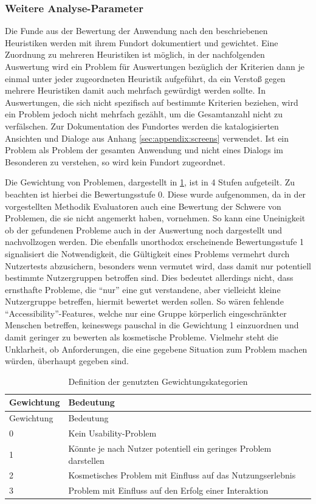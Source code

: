 \documentclass[
  12pt,
  ngerman,
  a4paper,
]{article}
\begin{document}
\hypertarget{weitere-analyse-parameter}{%
\subsubsection{Weitere
Analyse-Parameter}\label{weitere-analyse-parameter}}

Die Funde aus der Bewertung der Anwendung nach den beschriebenen
Heuristiken werden mit ihrem Fundort dokumentiert und gewichtet. Eine
Zuordnung zu mehreren Heuristiken ist möglich, in der nachfolgenden
Auswertung wird ein Problem für Auswertungen bezüglich der Kriterien
dann je einmal unter jeder zugeordneten Heuristik aufgeführt, da ein
Verstoß gegen mehrere Heuristiken damit auch mehrfach gewürdigt werden
sollte. In Auswertungen, die sich nicht spezifisch auf bestimmte
Kriterien beziehen, wird ein Problem jedoch nicht mehrfach gezählt, um
die Gesamtanzahl nicht zu verfälschen. Zur Dokumentation des Fundortes
werden die katalogisierten Ansichten und Dialoge aus Anhang
\ref{sec:appendix:screens} verwendet. Ist ein Problem als Problem der
gesamten Anwendung und nicht eines Dialogs im Besonderen zu verstehen,
so wird kein Fundort zugeordnet.

Die Gewichtung von Problemen, dargestellt in
\cref{tbl:weighting-definition}, ist in 4 Stufen aufgeteilt. Zu beachten
ist hierbei die Bewertungsstufe 0. Diese wurde aufgenommen, da in der
vorgestellten Methodik Evaluatoren auch eine Bewertung der Schwere von
Problemen, die sie nicht angemerkt haben, vornehmen. So kann eine
Uneinigkeit ob der gefundenen Probleme auch in der Auswertung noch
dargestellt und nachvollzogen werden. Die ebenfalls unorthodox
erscheinende Bewertungsstufe 1 signalisiert die Notwendigkeit, die
Gültigkeit eines Problems vermehrt durch Nutzertests abzusichern,
besonders wenn vermutet wird, dass damit nur potentiell bestimmte
Nutzergruppen betroffen sind. Dies bedeutet allerdings nicht, dass
ernsthafte Probleme, die ``nur'' eine gut verstandene, aber vielleicht
kleine Nutzergruppe betreffen, hiermit bewertet werden sollen. So wären
fehlende ``Accessibility''-Features, welche nur eine Gruppe körperlich
eingeschränkter Menschen betreffen, keineswegs pauschal in die
Gewichtung 1 einzuordnen und damit geringer zu bewerten als kosmetische
Probleme. Vielmehr steht die Unklarheit, ob Anforderungen, die eine
gegebene Situation zum Problem machen würden, überhaupt gegeben sind.

\begin{longtable}[]{@{}ll@{}}
\caption{Definition der genutzten Gewichtungskategorien
\label{tbl:weighting-definition}}\tabularnewline
\toprule
Gewichtung & Bedeutung\tabularnewline
\midrule
\endfirsthead
\toprule
Gewichtung & Bedeutung\tabularnewline
\midrule
\endhead
0 & Kein Usability-Problem\tabularnewline
1 & Könnte je nach Nutzer potentiell ein geringes Problem
darstellen\tabularnewline
2 & Kosmetisches Problem mit Einfluss auf das
Nutzungserlebnis\tabularnewline
3 & Problem mit Einfluss auf den Erfolg einer Interaktion\tabularnewline
\bottomrule
\end{longtable}
\end{document}
